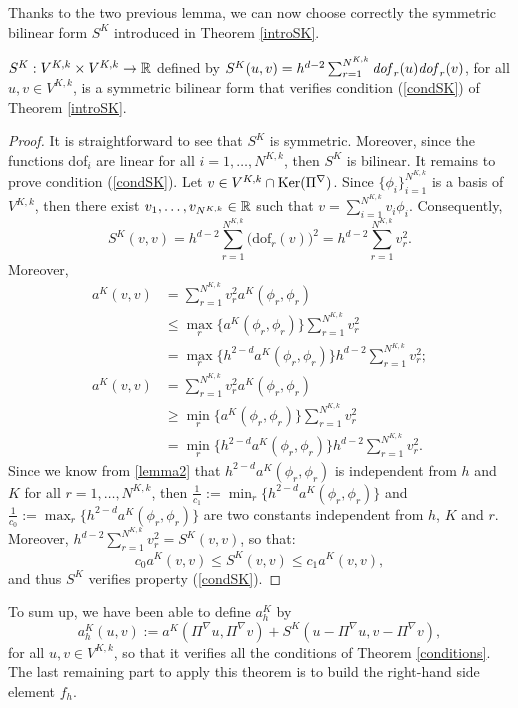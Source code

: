 Thanks to the two previous lemma, we can now choose correctly the symmetric bilinear form $S^K$ introduced in Theorem \ref{introSK}. 
\begin{proposition}
$S^K:V^{K,k}\times V^{K,k}\rightarrow \mathbb{R}$ defined by $S^K(u,v) = h^{d-2}\sum_{r=1}^{N^{K,k}} \text{\emph{dof}}_r(u)\text{\emph{dof}}_r(v)$, for all $u,v\in V^{K,k}$, is a symmetric bilinear form that verifies condition (\ref{condSK}) of Theorem \ref{introSK}. 
\end{proposition}
\begin{proof}
It is straightforward to see that $S^K$ is symmetric. Moreover, since the functions dof$_i$ are linear for all $i=1,\ldots,N^{K,k}$, then $S^K$ is bilinear. It remains to prove condition (\ref{condSK}). Let $v\in V^{K,k}\cap {\rm Ker}(\Pi^\nabla)$. Since $\{\phi_i\}_{i=1}^{N^{K,k}}$ is a basis of $V^{K,k}$, then there exist $v_1,\ldots,v_{N^{K,k}}\in \mathbb{R}$ such that $v=\sum_{i=1}^{N^{K,k}} v_i\phi_i$. Consequently, 
$$S^K(v,v) = h^{d-2}\sum_{r=1}^{N^{K,k}} \big(\text{dof}_r\left(v\right)\big)^2 = h^{d-2}\sum_{r=1}^{N^{K,k}} v_r^2.$$
Moreover, 
\begin{align*}
a^K(v,v) &= \sum_{r=1}^{N^{K,k}} v_r^2 a^K(\phi_r,\phi_r)\\
&\leq \max_r\Big\{a^K(\phi_r, \phi_r)\Big\} \sum_{r=1}^{N^{K,k}} v_r^2\\
&= \max_r\Big\{h^{2-d}a^K(\phi_r, \phi_r)\Big\} h^{d-2} \sum_{r=1}^{N^{K,k}} v_r^2;\\
a^K(v,v) &= \sum_{r=1}^{N^{K,k}} v_r^2 a^K(\phi_r,\phi_r)\\
&\geq \min_r\Big\{a^K(\phi_r, \phi_r)\Big\} \sum_{r=1}^{N^{K,k}} v_r^2\\
&= \min_r\Big\{h^{2-d}a^K(\phi_r, \phi_r)\Big\} h^{d-2} \sum_{r=1}^{N^{K,k}} v_r^2.
\end{align*}
Since we know from \ref{lemma2} that $h^{2-d}a^K(\phi_r,\phi_r)$ is independent from $h$ and $K$ for all $r=1,\ldots,N^{K,k}$, then $\frac{1}{c_1}:=\min_r\Big\{h^{2-d}a^K(\phi_r, \phi_r)\Big\}$ and $\frac{1}{c_0}:=\max_r\Big\{h^{2-d}a^K(\phi_r, \phi_r)\Big\}$ are two constants independent from $h$, $K$ and $r$. Moreover, $h^{d-2}\sum_{r=1}^{N^{K,k}}v_r^2=S^K(v,v)$, so that:
$$ c_0a^K(v,v)\leq S^K(v,v) \leq c_1a^K(v,v),$$
and thus $S^K$ verifies property (\ref{condSK}).
\end{proof}

To sum up, we have been able to define $a_h^K$ by $$a_h^K(u,v):=a^K(\Pi^\nabla u, \Pi^\nabla v) + S^K(u-\Pi^\nabla u, v-\Pi^\nabla v),$$ 
for all $u,v\in V^{K,k}$, so that it verifies all the conditions of Theorem \ref{conditions}. The last remaining part to apply this theorem is to build the right-hand side element $f_h$.

